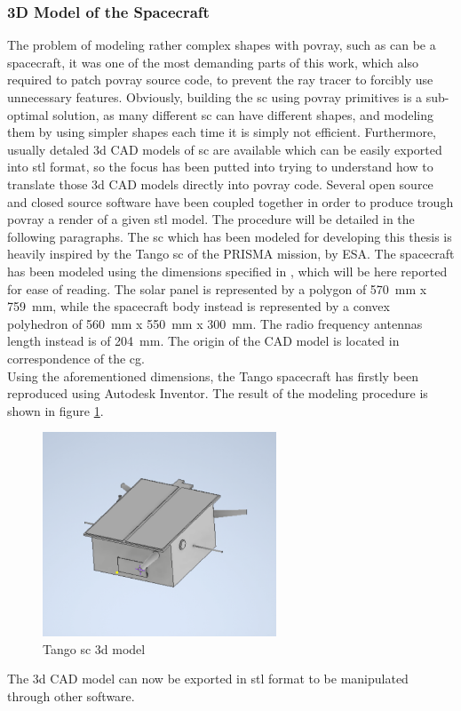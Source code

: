 \subsubsection{3D Model of the Spacecraft}\label{sec:3dmodel}
The problem of modeling rather complex shapes with \acrshort{povray}, such as can be a spacecraft, it was one of the most demanding parts of this work, which also required to patch \acrshort{povray} source code, to prevent the ray tracer to forcibly use unnecessary features. Obviously, building the \acrshort{sc} using \acrshort{povray} primitives is a sub-optimal solution, as many different \acrshort{sc} can have different shapes, and modeling them by using simpler shapes each time it is simply not efficient. Furthermore, usually detaled \acrshort{3d} CAD models of \acrshort{sc} are available which can be easily exported into \acrshort{stl} format, so the focus has been putted into trying to understand how to translate those \acrshort{3d} CAD models directly into \acrshort{povray} code.
Several open source and closed source software have been coupled together in order to produce trough \acrshort{povray} a render of a given \acrshort{stl} model.
The procedure will be detailed in the following paragraphs.
The \acrshort{sc} which has been modeled for developing this thesis is heavily inspired by the Tango \acrshort{sc} of the PRISMA mission, by ESA.
The spacecraft has been modeled using the dimensions specified in \cite{Sharma2018}, which will be here reported for ease of reading. The solar panel is represented by a polygon of \SI{570}{\mm} x \SI{759}{\mm}, while the spacecraft body instead is represented by a convex polyhedron of \SI{560}{\mm} x \SI{550}{mm} x \SI{300}{\mm}. The radio frequency antennas length instead is of \SI{204}{\mm}. The origin of the CAD model is located in correspondence of the \acrshort{cg}.\\
Using the aforementioned dimensions, the Tango spacecraft has firstly been reproduced using Autodesk Inventor. The result of the modeling procedure is shown in figure \ref{fig:tango3d}.

\begin{figure}[htbp]
  \centering
  \includegraphics[width=0.62\textwidth]{gfx/tangoScreenshot2.eps}
  \caption{Tango \acrshort{sc} \acrshort{3d} model}
  \label{fig:tango3d}
\end{figure}
The \acrshort{3d} CAD model can now be exported in \acrshort{stl} format to be manipulated through other software.

